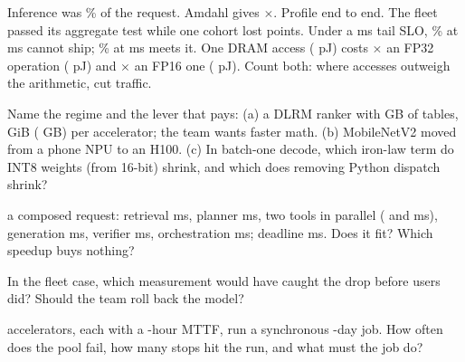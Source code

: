 \documentclass{studysheet}
\begin{document}
\begin{rightcol}
%
  {Inference was \% of the request. Amdahl gives
   $\times$. Profile end to end.}{}
%
  {The fleet passed its aggregate test while one cohort lost  points. Under a  ms
   tail SLO, \% at  ms cannot ship; \% at  ms meets it.}{}
%
  {One DRAM access ( pJ) costs $\times$ an FP32 operation ( pJ) and $\times$
   an FP16 one ( pJ). Count both: where accesses outweigh the arithmetic, cut traffic.}{}

\vspace{2pt}
\begin{qs}
\item Name the regime and the lever that pays: (a) a DLRM ranker with  GB of tables,  GiB
  ( GB) per accelerator; the team wants faster math.
  (b) MobileNetV2 moved from a phone NPU to an H100. (c) In batch-one decode, which iron-law term do INT8
  weights (from 16-bit) shrink, and which does removing Python dispatch shrink?
\item \assumed{} a composed request: retrieval  ms, planner  ms, two tools in parallel
  ( and  ms), generation  ms, verifier  ms, orchestration  ms;
  deadline  ms. Does it fit? Which speedup buys nothing?
\item In the fleet case, which measurement would have caught the drop before users did? Should the
  team roll back the model?
\item \assumed{}  accelerators, each with a -hour MTTF, run a synchronous -day job.
  How often does the pool fail, how many stops hit the run, and what must the job do?
\end{qs}
\end{rightcol}
\end{document}
